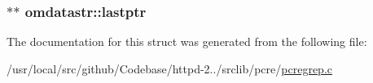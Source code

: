 \subsubsection[{\texorpdfstring{lastptr}{lastptr}}]{$\ast$$\ast$ omdatastr\+::lastptr}\hypertarget{structomdatastr_a76352b9ff79e8bd0ac6faa9199b8fd53}{}\label{structomdatastr_a76352b9ff79e8bd0ac6faa9199b8fd53}


The documentation for this struct was generated from the following file\+:\begin{DoxyCompactItemize}
\item 
/usr/local/src/github/\+Codebase/httpd-\/2../srclib/pcre/\hyperlink{pcregrep_8c}{pcregrep.\+c}\end{DoxyCompactItemize}
